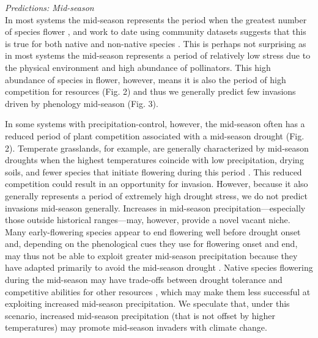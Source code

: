 \documentclass[11pt,a4paper,oneside]{article}
\begin{document}
\noindent \emph{Predictions: Mid-season}\\
\noindent In most systems the mid-season represents the period when the greatest number of species flower \citep[e.g.,][]{Fitter:2002sm,Aldridge:2011}, and work to date using community datasets suggests that this is true for both native and non-native species \citep{wolkovichAmBot2013}. This is perhaps not surprising as in most systems the mid-season represents a period of relatively low stress due to the physical environment and high abundance of pollinators. This high abundance of species in flower, however, means it is also the period of high competition for resources (Fig. 2) and thus we generally predict few invasions driven by phenology mid-season (Fig. 3). 

In some systems with precipitation-control, however, the mid-season often has a reduced period of plant competition associated with a mid-season drought (Fig. 2). Temperate grasslands, for example, are generally characterized by mid-season droughts when the highest temperatures coincide with low precipitation, drying soils, and fewer species that initiate flowering during this period \citep[e.g.,][]{Craine:2012kl}. This reduced competition could result in an opportunity for invasion. However, because it also generally represents a period of extremely high drought stress, we do not predict invasions mid-season generally. Increases in mid-season precipitation---especially those outside historical ranges---may, however, provide a novel vacant niche. Many early-flowering species appear to end flowering well before drought onset and, depending on the phenological cues they use for flowering onset and end, may thus not be able to exploit greater mid-season precipitation because they have adapted primarily to avoid the mid-season drought \citep{Craine:2012kl,Craine2013}. Native species flowering during the mid-season may have trade-offs between drought tolerance and competitive abilities for other resources \citep{Craine2013}, which may make them less successful at exploiting increased mid-season precipitation. We speculate that, under this scenario, increased mid-season precipitation (that is not offset by higher temperatures) may promote mid-season invaders with climate change.\\
\end{document}
